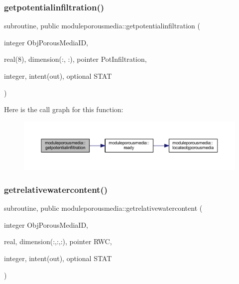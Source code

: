 \subsubsection{\texorpdfstring{getpotentialinfiltration()}{getpotentialinfiltration()}}
{\footnotesize\ttfamily subroutine, public moduleporousmedia\+::getpotentialinfiltration (\begin{DoxyParamCaption}\item[{integer}]{Obj\+Porous\+Media\+ID,  }\item[{real(8), dimension(\+:, \+:), pointer}]{Pot\+Infiltration,  }\item[{integer, intent(out), optional}]{S\+T\+AT }\end{DoxyParamCaption})}

Here is the call graph for this function\+:\nopagebreak
\begin{figure}[H]
\begin{center}
\leavevmode
\includegraphics[width=350pt]{namespacemoduleporousmedia_aa235c3281ca1f6104396eec860cafc63_cgraph}
\end{center}
\end{figure}
\mbox{\label{namespacemoduleporousmedia_a97c2a20bb7ae4ddffb2c0f4d7586412a}} 
\subsubsection{\texorpdfstring{getrelativewatercontent()}{getrelativewatercontent()}}
{\footnotesize\ttfamily subroutine, public moduleporousmedia\+::getrelativewatercontent (\begin{DoxyParamCaption}\item[{integer}]{Obj\+Porous\+Media\+ID,  }\item[{real, dimension(\+:,\+:,\+:), pointer}]{R\+WC,  }\item[{integer, intent(out), optional}]{S\+T\+AT }\end{DoxyParamCaption})}

